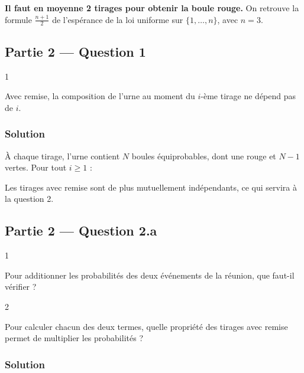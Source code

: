 \documentclass[11pt,a4paper]{article}
\newcommand{\equationajustee}[1]{%
  \sbox{\boiteequation}{$\displaystyle #1$}%
  \ifdim\wd\boiteequation>\linewidth
    \[\resizebox{\linewidth}{!}{\usebox{\boiteequation}}\]%
  \else
    \[#1\]%
  \fi}
\begin{document}
\textbf{Il faut en moyenne 2 tirages pour obtenir la boule rouge.} On retrouve la formule \(\frac{n+1}2\) de l'espérance de la loi uniforme sur \(\{1,\dots,n\}\), avec \(n=3\).

\hypertarget{partie-2-question-1}{%
\subsection{Partie 2 --- Question 1}\label{partie-2-question-1}}

\begin{indication}{1}

Avec remise, la composition de l'urne au moment du \(i\)-ème tirage ne dépend pas de \(i\).

\end{indication}

\hypertarget{solution-30}{%
\subsubsection{Solution}\label{solution-30}}

À chaque tirage, l'urne contient \(N\) boules équiprobables, dont une rouge et \(N-1\) vertes. Pour tout \(i\ge1\) :

\equationajustee{\boxed{P(R_i)=\frac1N\ \text{ et }\ P(V_i)=\frac{N-1}N.}}

Les tirages avec remise sont de plus mutuellement indépendants, ce qui servira à la question 2.

\hypertarget{partie-2-question-2.a}{%
\subsection{Partie 2 --- Question 2.a}\label{partie-2-question-2.a}}

\begin{indication}{1}

Pour additionner les probabilités des deux événements de la réunion, que faut-il vérifier ?

\end{indication}

\begin{indication}{2}

Pour calculer chacun des deux termes, quelle propriété des tirages avec remise permet de multiplier les probabilités ?

\end{indication}

\hypertarget{solution-31}{%
\subsubsection{Solution}\label{solution-31}}
\end{document}
